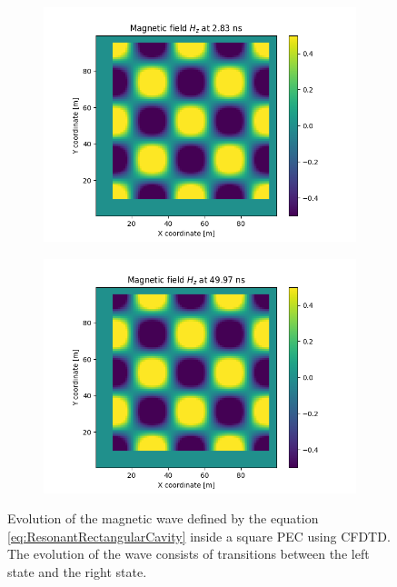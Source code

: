 \documentclass[12pt, oneside]{book}
\begin{document}
\begin{figure}[H]
    \centering
    \begin{subfigure}[b]{0.49\textwidth}
        \centering
        \includegraphics[width=\textwidth]{Imagenes/CFDTD2D_ResonantRectangularCavity1.png}
    \end{subfigure}
    \begin{subfigure}[b]{0.49\textwidth}
        \centering
        \includegraphics[width=\textwidth]{Imagenes/CFDTD2D_ResonantRectangularCavity2.png}
    \end{subfigure}
    \caption{Evolution of the magnetic wave defined by the equation \ref{eq:ResonantRectangularCavity} inside a square PEC using CFDTD. The evolution of the wave consists of transitions between the left state and the right state.}
    \label{fig:CFDTD2D_RectangularResonantCavity}
\end{figure}
\end{document}
